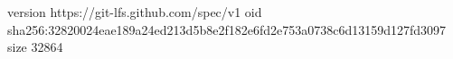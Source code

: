 version https://git-lfs.github.com/spec/v1
oid sha256:32820024eae189a24ed213d5b8e2f182e6fd2e753a0738c6d13159d127fd3097
size 32864
